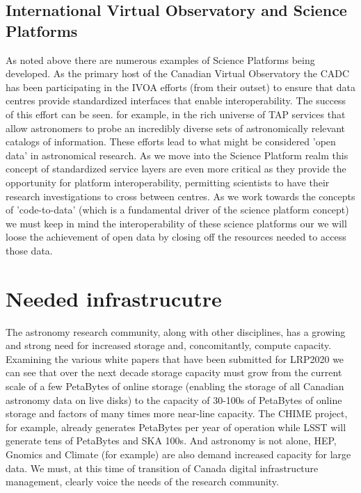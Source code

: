 \documentclass[11pt]{article}
\begin{document}
\subsection{International Virtual Observatory and Science Platforms}
As noted above there are numerous examples of Science Platforms being developed.  As the primary host of the Canadian Virtual Observatory the CADC has been participating in the IVOA efforts (from their outset) to ensure that data centres provide standardized interfaces that enable interoperability.  The success of this effort can be seen. for example, in the rich universe of TAP services that allow astronomers to probe an incredibly diverse sets of astronomically relevant catalogs of information. These efforts lead to what might be considered 'open data' in astronomical research. As we move into the Science Platform realm this concept of standardized service layers are even more critical as they provide the opportunity for platform interoperability, permitting scientists to have their research investigations to cross between centres.  As we work towards the concepts of 'code-to-data' (which is a fundamental driver of the science platform concept) we must keep in mind the interoperability of these science platforms our we will loose the achievement of open data by closing off the resources needed to access those data.

\section{Needed infrastrucutre}
The astronomy research community, along with other disciplines,  has a growing and strong need for increased storage and, concomitantly, compute capacity.
Examining the various white papers that have been submitted for LRP2020 we can see that over the next decade storage capacity must grow from the current scale of a few PetaBytes of online storage (enabling the storage of all Canadian astronomy data on live disks) to the capacity of 30-100s of PetaBytes of online storage and factors of many times more near-line capacity.  The CHIME project, for example, already generates PetaBytes per year of operation while LSST will generate tens of PetaBytes and SKA 100s.  
And astronomy is not alone, HEP, Gnomics and Climate (for example) are also demand increased capacity for large data.  We must, at this time of transition of Canada digital infrastructure management, clearly voice the needs of the research community.
\end{document}
